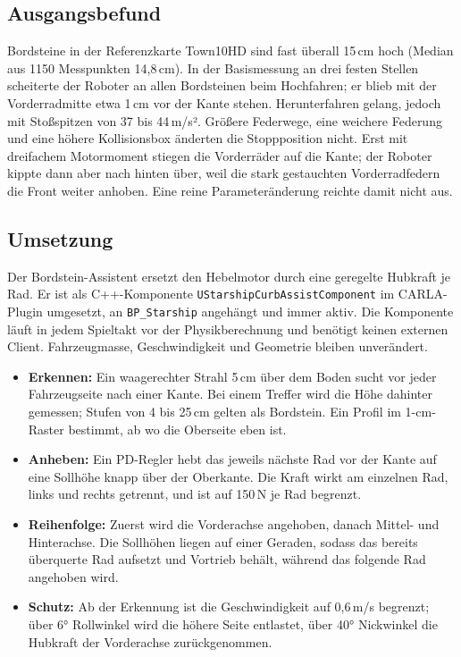 \subsection{Ausgangsbefund}
\label{sec:starship_bordstein_befund}

Bordsteine in der Referenzkarte Town10HD sind fast überall 15\,cm hoch (Median aus 1150
Messpunkten 14,8\,cm). In der Basismessung an drei festen Stellen scheiterte der Roboter
an allen Bordsteinen beim Hochfahren; er blieb mit der Vorderradmitte etwa 1\,cm vor der
Kante stehen. Herunterfahren gelang, jedoch mit Stoßspitzen von 37 bis 44\,m/s².
Größere Federwege, eine weichere Federung und eine höhere Kollisionsbox änderten die
Stoppposition nicht. Erst mit dreifachem Motormoment stiegen die Vorderräder auf die
Kante; der Roboter kippte dann aber nach hinten über, weil die stark gestauchten
Vorderradfedern die Front weiter anhoben. Eine reine Parameteränderung reichte damit
nicht aus.

\subsection{Umsetzung}
\label{sec:starship_bordstein_umsetzung}

Der Bordstein-Assistent ersetzt den Hebelmotor durch eine geregelte Hubkraft je Rad. Er
ist als C++-Komponente \texttt{UStarshipCurbAssistComponent} im CARLA-Plugin umgesetzt,
an \texttt{BP\_Starship} angehängt und immer aktiv. Die Komponente läuft in jedem
Spieltakt vor der Physikberechnung und benötigt keinen externen Client. Fahrzeugmasse,
Geschwindigkeit und Geometrie bleiben unverändert.

\begin{itemize}
  \item \textbf{Erkennen:} Ein waagerechter Strahl 5\,cm über dem Boden sucht vor jeder
  Fahrzeugseite nach einer Kante. Bei einem Treffer wird die Höhe dahinter gemessen;
  Stufen von 4 bis 25\,cm gelten als Bordstein. Ein Profil im 1-cm-Raster bestimmt, ab
  wo die Oberseite eben ist.
  \item \textbf{Anheben:} Ein PD-Regler hebt das jeweils nächste Rad vor der Kante auf
  eine Sollhöhe knapp über der Oberkante. Die Kraft wirkt am einzelnen Rad, links und
  rechts getrennt, und ist auf 150\,N je Rad begrenzt.
  \item \textbf{Reihenfolge:} Zuerst wird die Vorderachse angehoben, danach Mittel- und
  Hinterachse. Die Sollhöhen liegen auf einer Geraden, sodass das bereits überquerte Rad
  aufsetzt und Vortrieb behält, während das folgende Rad angehoben wird.
  \item \textbf{Schutz:} Ab der Erkennung ist die Geschwindigkeit auf 0,6\,m/s begrenzt;
  über 6° Rollwinkel wird die höhere Seite entlastet, über 40° Nickwinkel die Hubkraft
  der Vorderachse zurückgenommen.
\end{itemize}

